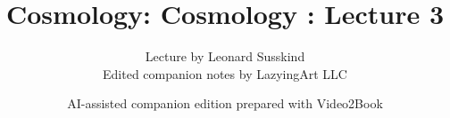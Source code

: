 \documentclass[11pt,oneside]{book}
\begin{document}
\frontmatter
\title{Cosmology: Cosmology : Lecture 3}
\author{Lecture by Leonard Susskind\\Edited companion notes by LazyingArt LLC}
\date{AI-assisted companion edition prepared with Video2Book}
\maketitle
\clearpage
\mainmatter

\end{document}
